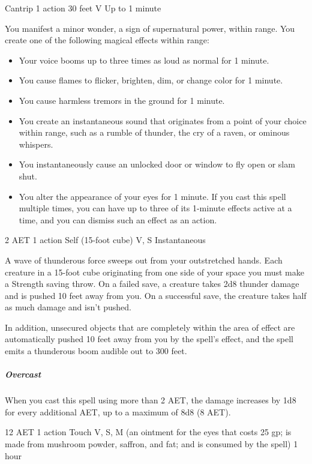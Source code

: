 {Cantrip}
{1 action}
{30 feet}
{V}
{Up to 1 minute}

You manifest a minor wonder, a sign of supernatural power, within range. You create one of the following magical effects within range:
\begin{itemize}
\item Your voice booms up to three times as loud as normal for 1 minute.
\item You cause flames to flicker, brighten, dim, or change color for 1 minute.
\item You cause harmless tremors in the ground for 1 minute.
\item You create an instantaneous sound that originates from a point of your choice within range, such as a rumble of thunder, the cry of a raven, or ominous whispers.
\item You instantaneously cause an unlocked door or window to fly open or slam shut.
\item You alter the appearance of your eyes for 1 minute. If you cast this spell multiple times, you can have up to three of its 1-minute effects active at a time, and you can dismiss such an effect as an action.
\end{itemize}


{2 AET}
{1 action}
{Self (15-foot cube)}
{V, S}
{Instantaneous}

A wave of thunderous force sweeps out from your outstretched hands. Each creature in a 15-foot cube originating from one side of your space you must make a Strength saving throw. On a failed save, a creature takes 2d8 thunder damage and is pushed 10 feet away from you. On a successful save, the creature takes half as much damage and isn't pushed.

In addition, unsecured objects that are completely within the area of effect are automatically pushed 10 feet away from you by the spell's effect, and the spell emits a thunderous boom audible out to 300 feet.

\subparagraph*{Overcast} When you cast this spell using more than 2 AET, the damage increases by 1d8 for every additional AET, up to a maximum of 8d8 (8 AET).


{12 AET}
{1 action}
{Touch}
{V, S, M (an ointment for the eyes that costs 25 gp; is made from mushroom powder, saffron, and fat; and is consumed by the spell)}
{1 hour}

